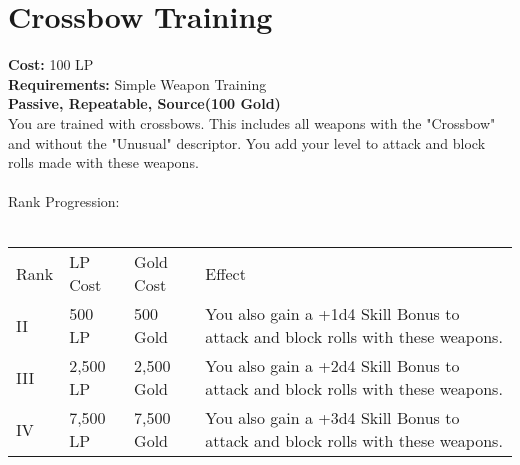 \section{Crossbow Training}\label{perk:crossbowTraining}
\textbf{Cost:} 100 LP\\
\textbf{Requirements:} Simple Weapon Training\\
\textbf{Passive, Repeatable, Source(100 Gold)}\\
You are trained with crossbows.
This includes all weapons with the "Crossbow" and without the "Unusual" descriptor.
You add your level to attack and block rolls made with these weapons.\\
\\
Rank Progression:\\
\\
\begin{longtable}{l | l | l | p{9cm}}
	Rank & LP Cost & Gold Cost & Effect\\
	II & 500 LP & 500 Gold & You also gain a +1d4 Skill Bonus to attack and block rolls with these weapons.\\
	III & 2,500 LP & 2,500 Gold & You also gain a +2d4 Skill Bonus to attack and block rolls with these weapons.\\
	IV & 7,500 LP & 7,500 Gold & You also gain a +3d4 Skill Bonus to attack and block rolls with these weapons.\\
\end{longtable}